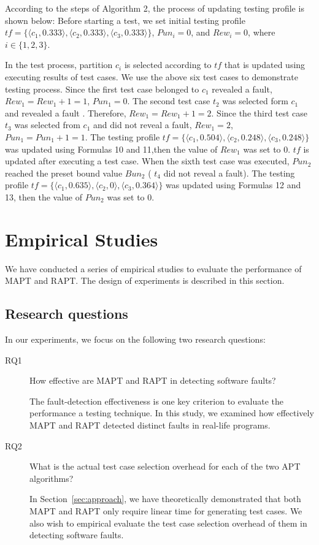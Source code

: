 \documentclass[10pt,journal,compsoc]{IEEEtran}
\begin{document}
According to the steps of Algorithm 2, the process of updating testing profile is shown below: Before starting a test, we set initial testing profile $tf = \{\langle c_1, 0.333 \rangle,\langle c_2, 0.333 \rangle, \langle c_3, 0.333 \rangle\}$, $Pun_i = 0$, and $Rew_i = 0$, where $i \in \{1, 2, 3\}$.

In the test process, partition $c_i$ is selected according to $tf$ that is updated using  executing results of test cases. We use the above six test cases to demonstrate testing process. Since the first test case belonged to $c_1$ revealed a fault, $Rew_1 = Rew_1 + 1 = 1$, $Pun_1 = 0$. The second test case $t_2$ was selected form $c_1$ and revealed a fault . Therefore, $Rew_1 = Rew_1 + 1 = 2$. Since the third test case $t_3$ was selected from $c_1$ and did not reveal a fault, $Rew_1 = 2$, $Pun_1 = Pun_1 + 1 = 1$. The testing profile $tf = \{\langle c_1, 0.504 \rangle,\langle c_2, 0.248 \rangle, \langle c_3, 0.248 \rangle\}$ was updated using Formulas 10 and 11,then the value of $Rew_1$ was set to 0. $tf$ is updated after executing a test case. When the sixth test case was executed, $Pun_2$ reached the preset bound value $Bun_2$ ( $t_4$ did not reveal a fault). The testing profile $tf = \{\langle c_1, 0.635 \rangle,\langle c_2, 0 \rangle, \langle c_3, 0.364 \rangle\}$ was updated using Formulas 12 and 13, then the value of $Pun_2$ was set to 0.



\section{Empirical Studies}
\label{sec:exp}

We have conducted a series of empirical studies to evaluate the performance of MAPT and RAPT. The design of experiments is described in this section.

\subsection{Research questions}

In our experiments, we focus on the following two research questions:

\begin{description}
\item [RQ1] How effective are MAPT and RAPT in detecting software faults?

The fault-detection effectiveness is one key criterion to evaluate the performance a testing technique. In this study, we examined how effectively MAPT and RAPT detected distinct faults in real-life programs.
\item [RQ2] What is the actual test case selection overhead for each of the two APT algorithms?

In Section~\ref{sec:approach}, we have theoretically demonstrated that both MAPT and RAPT only require linear time for generating test cases. We also wish to empirical evaluate the test case selection overhead of them in detecting software faults.
\end{description}
\end{document}
